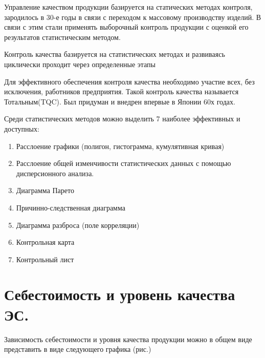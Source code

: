 \documentclass[unicode, 12pt, a4paper, oneside]{article}
\begin{document}
Управление качеством продукции базируется на статических методах контроля, зародилось в 30-е годы в связи с переходом к массовому производству изделий. В связи с этим стали применять выборочный контроль продукции с оценкой его результатов статистическим методом.

Контроль качества базируется на статистических методах и развиваясь циклически проходит через определенные этапы

Для эффективного обеспечения контроля качества необходимо участие всех, без исключения, работников предприятия. Такой контроль качества называется Тотальным(TQC). Был придуман и внедрен впервые в Японии 60х годах.

Среди статистических методов можно выделить 7 наиболее эффективных и доступных:
\begin{enumerate}
\item	Расслоение графики (полигон, гистограмма, кумулятивная кривая)
\item	Расслоение общей изменчивости статистических данных с помощью дисперсионного анализа.
\item	Диаграмма Парето
\item	Причинно-следственная диаграмма
\item	Диаграмма разброса (поле корреляции)
\item	Контрольная карта
\item	Контрольный лист
\end{enumerate}


\section{Себестоимость и уровень качества ЭС.}

Зависимость себестоимости и уровня качества продукции можно в общем виде представить в виде следующего графика (рис.)
\end{document}

